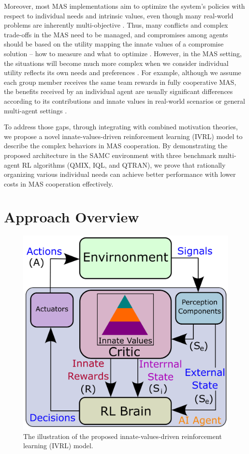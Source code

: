 \documentclass[letterpaper]{article} %
\begin{document}
Moreover, most MAS implementations aim to optimize the system's policies with respect to individual needs and intrinsic values, even though many real-world problems are inherently multi-objective \cite{ruadulescu2020multi}. Thus, many conflicts and complex trade-offs in the MAS need to be managed, and compromises among agents should be based on the utility mapping the innate values of a compromise solution -- how to measure and what to optimize \cite{zintgraf2015quality}. However, in the MAS setting, the situations will become much more complex when we consider individual utility reflects its own needs and preferences \cite{yang2019self,yang2020hierarchical}. For example, although we assume each group member receives the same team rewards in fully cooperative MAS, the benefits received by an individual agent are usually significant differences according to its contributions and innate values in real-world scenarios or general multi-agent settings \cite{yang2023understanding}. 

To address those gaps, through integrating with combined motivation theories, we propose a novel innate-values-driven reinforcement learning (IVRL) model to describe the complex behaviors in MAS cooperation. By demonstrating the proposed architecture in the SAMC environment with three benchmark multi-agent RL algorithms (QMIX, IQL, and QTRAN), we prove that rationally organizing various individual needs can achieve better performance with lower costs in MAS cooperation effectively.

\section{Approach Overview}

\begin{figure}[t]
\centering
\includegraphics[width=0.85\columnwidth]{./figures/innate_values_RL_models.pdf}
\caption{The illustration of the proposed innate-values-driven reinforcement learning (IVRL) model.}
\label{fig:innate_values}
\end{figure}
\end{document}
